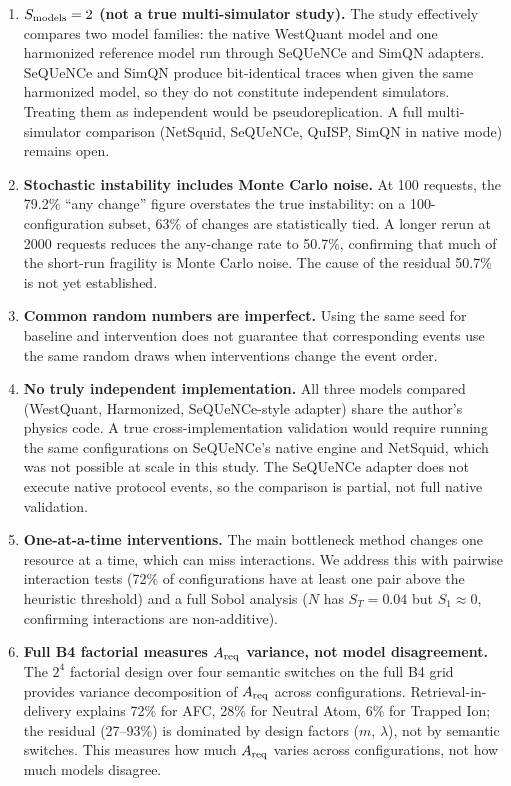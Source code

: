\documentclass[aps,prapplied,reprint,superscriptaddress]{revtex4-2}
\begin{document}
\begin{enumerate}[leftmargin=2em]
\item \textbf{$S_{\rm models} = 2$ (not a true multi-simulator study).} The study effectively compares two model families: the native WestQuant model and one harmonized reference model run through SeQUeNCe and SimQN adapters. SeQUeNCe and SimQN produce bit-identical traces when given the same harmonized model, so they do not constitute independent simulators. Treating them as independent would be pseudoreplication. A full multi-simulator comparison (NetSquid, SeQUeNCe, QuISP, SimQN in native mode) remains open.

\item \textbf{Stochastic instability includes Monte Carlo noise.} At 100 requests, the 79.2\% ``any change'' figure overstates the true instability: on a 100-configuration subset, 63\% of changes are statistically tied. A longer rerun at 2000 requests reduces the any-change rate to 50.7\%, confirming that much of the short-run fragility is Monte Carlo noise. The cause of the residual 50.7\% is not yet established.

\item \textbf{Common random numbers are imperfect.} Using the same seed for baseline and intervention does not guarantee that corresponding events use the same random draws when interventions change the event order.

\item \textbf{No truly independent implementation.} All three models compared (WestQuant, Harmonized, SeQUeNCe-style adapter) share the author's physics code. A true cross-implementation validation would require running the same configurations on SeQUeNCe's native engine and NetSquid, which was not possible at scale in this study. The SeQUeNCe adapter does not execute native protocol events, so the comparison is partial, not full native validation.

\item \textbf{One-at-a-time interventions.} The main bottleneck method changes one resource at a time, which can miss interactions. We address this with pairwise interaction tests (72\% of configurations have at least one pair above the heuristic threshold) and a full Sobol analysis ($N$ has $S_T = 0.04$ but $S_1 \approx 0$, confirming interactions are non-additive).

\item \textbf{Full B4 factorial measures $A_{\rm req}$ variance, not model disagreement.} The $2^4$ factorial design over four semantic switches on the full B4 grid provides variance decomposition of $A_{\rm req}$ across configurations. Retrieval-in-delivery explains 72\% for AFC, 28\% for Neutral Atom, 6\% for Trapped Ion; the residual (27--93\%) is dominated by design factors ($m$, $\lambda$), not by semantic switches. This measures how much $A_{\rm req}$ varies across configurations, not how much models disagree.


\end{enumerate}
\end{document}
